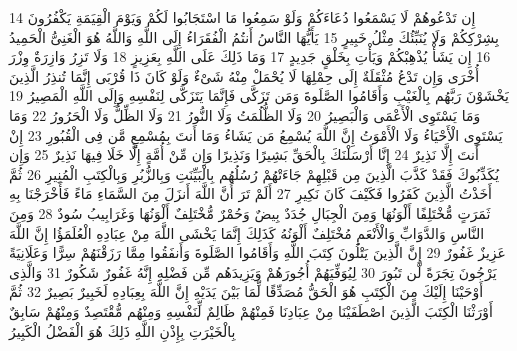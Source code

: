 \documentclass[20pt,a4paper]{article}
\begin{document}
{\tiny\colorbox{cl_aya}{14}} إِن تَدْعُوهُمْ لَا يَسْمَعُوا دُعَاءَكُمْ وَلَوْ سَمِعُوا مَا اسْتَجَابُوا لَكُمْ وَيَوْمَ الْقِيَمَةِ يَكْفُرُونَ بِشِرْكِكُمْ وَلَا يُنَبِّئُكَ مِثْلُ خَبِيرٍ
{\tiny\colorbox{cl_aya}{15}} يَأَيُّهَا النَّاسُ أَنتُمُ الْفُقَرَاءُ إِلَى اللَّهِ وَاللَّهُ هُوَ الْغَنِىُّ الْحَمِيدُ
{\tiny\colorbox{cl_aya}{16}} إِن يَشَأْ يُذْهِبْكُمْ وَيَأْتِ بِخَلْقٍ جَدِيدٍ
{\tiny\colorbox{cl_aya}{17}} وَمَا ذَلِكَ عَلَى اللَّهِ بِعَزِيزٍ
{\tiny\colorbox{cl_aya}{18}} وَلَا تَزِرُ وَازِرَةٌ وِزْرَ أُخْرَى وَإِن تَدْعُ مُثْقَلَةٌ إِلَى حِمْلِهَا لَا يُحْمَلْ مِنْهُ شَىْءٌ وَلَوْ كَانَ ذَا قُرْبَى إِنَّمَا تُنذِرُ الَّذِينَ يَخْشَوْنَ رَبَّهُم بِالْغَيْبِ وَأَقَامُوا الصَّلَوةَ وَمَن تَزَكَّى فَإِنَّمَا يَتَزَكَّى لِنَفْسِهِ وَإِلَى اللَّهِ الْمَصِيرُ
{\tiny\colorbox{cl_aya}{19}} وَمَا يَسْتَوِى الْأَعْمَى وَالْبَصِيرُ
{\tiny\colorbox{cl_aya}{20}} وَلَا الظُّلُمَتُ وَلَا النُّورُ
{\tiny\colorbox{cl_aya}{21}} وَلَا الظِّلُّ وَلَا الْحَرُورُ
{\tiny\colorbox{cl_aya}{22}} وَمَا يَسْتَوِى الْأَحْيَاءُ وَلَا الْأَمْوَتُ إِنَّ اللَّهَ يُسْمِعُ مَن يَشَاءُ وَمَا أَنتَ بِمُسْمِعٍ مَّن فِى الْقُبُورِ
{\tiny\colorbox{cl_aya}{23}} إِنْ أَنتَ إِلَّا نَذِيرٌ
{\tiny\colorbox{cl_aya}{24}} إِنَّا أَرْسَلْنَكَ بِالْحَقِّ بَشِيرًا وَنَذِيرًا وَإِن مِّنْ أُمَّةٍ إِلَّا خَلَا فِيهَا نَذِيرٌ
{\tiny\colorbox{cl_aya}{25}} وَإِن يُكَذِّبُوكَ فَقَدْ كَذَّبَ الَّذِينَ مِن قَبْلِهِمْ جَاءَتْهُمْ رُسُلُهُم بِالْبَيِّنَتِ وَبِالزُّبُرِ وَبِالْكِتَبِ الْمُنِيرِ
{\tiny\colorbox{cl_aya}{26}} ثُمَّ أَخَذْتُ الَّذِينَ كَفَرُوا فَكَيْفَ كَانَ نَكِيرِ
{\tiny\colorbox{cl_aya}{27}} أَلَمْ تَرَ أَنَّ اللَّهَ أَنزَلَ مِنَ السَّمَاءِ مَاءً فَأَخْرَجْنَا بِهِ ثَمَرَتٍ مُّخْتَلِفًا أَلْوَنُهَا وَمِنَ الْجِبَالِ جُدَدٌ بِيضٌ وَحُمْرٌ مُّخْتَلِفٌ أَلْوَنُهَا وَغَرَابِيبُ سُودٌ
{\tiny\colorbox{cl_aya}{28}} وَمِنَ النَّاسِ وَالدَّوَابِّ وَالْأَنْعَمِ مُخْتَلِفٌ أَلْوَنُهُ كَذَلِكَ إِنَّمَا يَخْشَى اللَّهَ مِنْ عِبَادِهِ الْعُلَمَؤُا إِنَّ اللَّهَ عَزِيزٌ غَفُورٌ
{\tiny\colorbox{cl_aya}{29}} إِنَّ الَّذِينَ يَتْلُونَ كِتَبَ اللَّهِ وَأَقَامُوا الصَّلَوةَ وَأَنفَقُوا مِمَّا رَزَقْنَهُمْ سِرًّا وَعَلَانِيَةً يَرْجُونَ تِجَرَةً لَّن تَبُورَ
{\tiny\colorbox{cl_aya}{30}} لِيُوَفِّيَهُمْ أُجُورَهُمْ وَيَزِيدَهُم مِّن فَضْلِهِ إِنَّهُ غَفُورٌ شَكُورٌ
{\tiny\colorbox{cl_aya}{31}} وَالَّذِى أَوْحَيْنَا إِلَيْكَ مِنَ الْكِتَبِ هُوَ الْحَقُّ مُصَدِّقًا لِّمَا بَيْنَ يَدَيْهِ إِنَّ اللَّهَ بِعِبَادِهِ لَخَبِيرٌ بَصِيرٌ
{\tiny\colorbox{cl_aya}{32}} ثُمَّ أَوْرَثْنَا الْكِتَبَ الَّذِينَ اصْطَفَيْنَا مِنْ عِبَادِنَا فَمِنْهُمْ ظَالِمٌ لِّنَفْسِهِ وَمِنْهُم مُّقْتَصِدٌ وَمِنْهُمْ سَابِقٌ بِالْخَيْرَتِ بِإِذْنِ اللَّهِ ذَلِكَ هُوَ الْفَضْلُ الْكَبِيرُ
\end{document}
